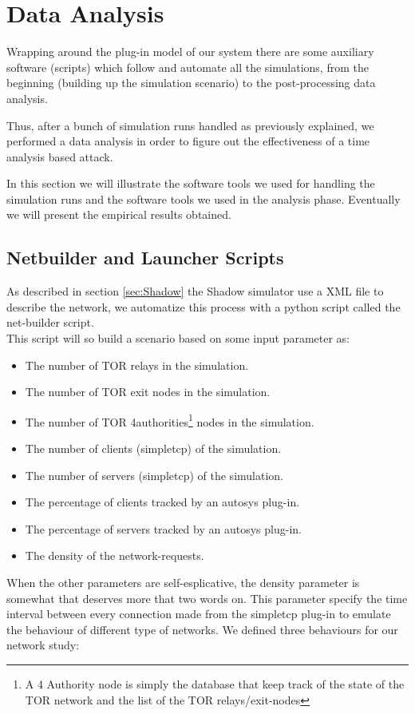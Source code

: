 \section{Data Analysis}
Wrapping around the plug-in model of our system there are some auxiliary
software (scripts)
which follow and automate all the simulations, from the beginning (building up
the simulation scenario) to the post-processing data analysis.

Thus, after a bunch of simulation runs handled as previously explained,
 we performed a data analysis in order to
figure out the effectiveness of a time analysis based attack.  

In this section we will illustrate the software tools we used for
handling the
simulation runs and the software tools we used in the analysis phase. 
Eventually we will 
present the empirical results
obtained.
\subsection{Netbuilder and Launcher Scripts}
As described in section \ref{sec:Shadow}
the Shadow simulator use a XML file to describe the network,
we automatize this process with a python script called the net-builder script.\\
This script will so build a scenario based on some input parameter as:
\begin{itemize}
\item The number of TOR relays in the simulation.
\item The number of TOR exit nodes in the simulation.
\item The number of TOR 4authorities\footnote{A 4 Authority node is simply the
database that keep track of the state of the TOR network and the list
of the TOR relays/exit-nodes} nodes in the simulation.
\item The number of clients (simpletcp) of the simulation.
\item The number of servers (simpletcp) of the simulation.
\item The percentage of clients tracked by an autosys plug-in.
\item The percentage of servers tracked by an autosys plug-in.
\item The density of the network-requests.
\end{itemize}

When the other parameters are self-esplicative, the density parameter is somewhat
that deserves more that two words on.
This parameter specify the time interval between every connection made from the
simpletcp plug-in to emulate the behaviour of different type of networks.
We defined three behaviours for our network study:

